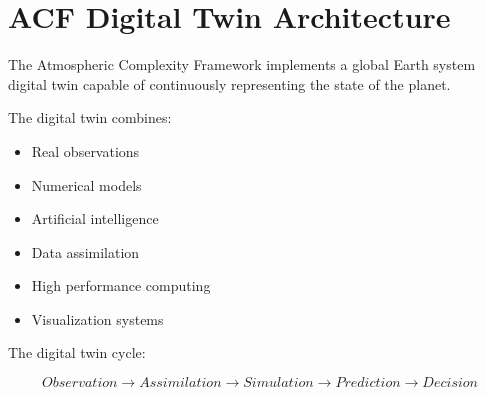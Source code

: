 \section{ACF Digital Twin Architecture}


The Atmospheric Complexity Framework implements a global Earth
system digital twin capable of continuously representing the
state of the planet.


The digital twin combines:


\begin{itemize}

\item Real observations

\item Numerical models

\item Artificial intelligence

\item Data assimilation

\item High performance computing

\item Visualization systems

\end{itemize}



The digital twin cycle:


\begin{equation}
Observation
\rightarrow
Assimilation
\rightarrow
Simulation
\rightarrow
Prediction
\rightarrow
Decision
\end{equation}
